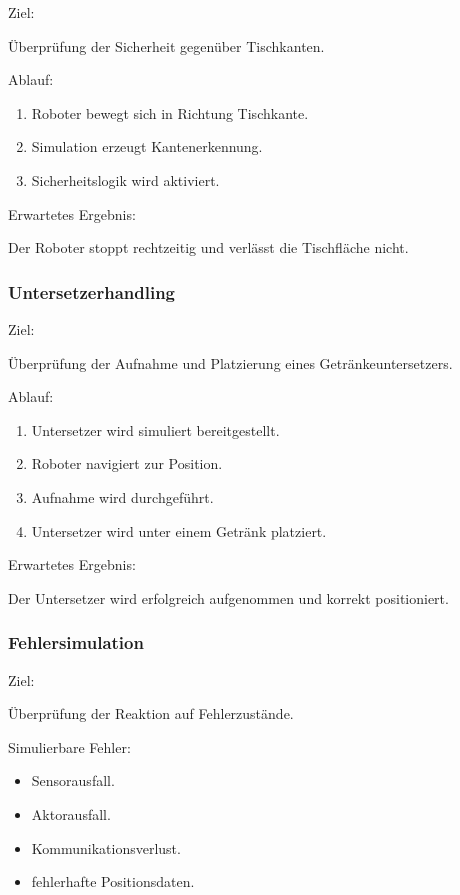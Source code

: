 \documentclass[
  a4paper,
  12pt,
  DIV=12,        %
  parskip=half,  %
  headings=small %
]{scrartcl}
\theoremstyle{definition}
\providecommand{\tightlist}{%
  \setlength{\itemsep}{0pt}\setlength{\parskip}{0pt}}
\theoremstyle{definition}
\begin{document}
Ziel:

Überprüfung der Sicherheit gegenüber Tischkanten.

Ablauf:

\begin{enumerate}
\def\labelenumi{\arabic{enumi}.}
\tightlist
\item
  Roboter bewegt sich in Richtung Tischkante.
\item
  Simulation erzeugt Kantenerkennung.
\item
  Sicherheitslogik wird aktiviert.
\end{enumerate}

Erwartetes Ergebnis:

Der Roboter stoppt rechtzeitig und verlässt die Tischfläche nicht.

\subsubsection{Untersetzerhandling}\label{untersetzerhandling-2}

Ziel:

Überprüfung der Aufnahme und Platzierung eines Getränkeuntersetzers.

Ablauf:

\begin{enumerate}
\def\labelenumi{\arabic{enumi}.}
\tightlist
\item
  Untersetzer wird simuliert bereitgestellt.
\item
  Roboter navigiert zur Position.
\item
  Aufnahme wird durchgeführt.
\item
  Untersetzer wird unter einem Getränk platziert.
\end{enumerate}

Erwartetes Ergebnis:

Der Untersetzer wird erfolgreich aufgenommen und korrekt positioniert.

\subsubsection{Fehlersimulation}\label{fehlersimulation}

Ziel:

Überprüfung der Reaktion auf Fehlerzustände.

Simulierbare Fehler:

\begin{itemize}
\tightlist
\item
  Sensorausfall.
\item
  Aktorausfall.
\item
  Kommunikationsverlust.
\item
  fehlerhafte Positionsdaten.
\end{itemize}
\end{document}
